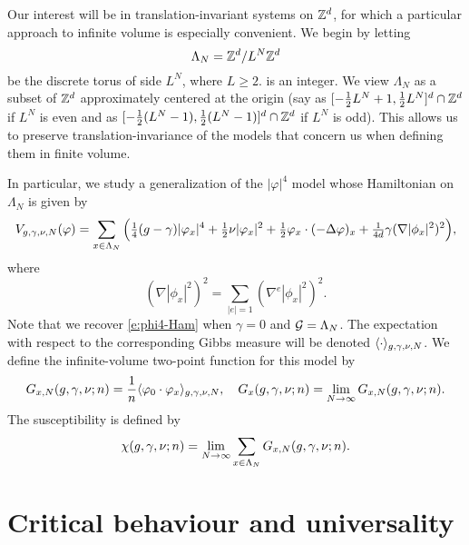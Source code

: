Our interest will be in translation-invariant systems on ${ {{\mathbb Z}}^d }$, for which a particular
approach to infinite volume is especially convenient. We begin by letting
\begin{equation}
\Lambda_N = { {{\mathbb Z}}^d }/L^N{ {{\mathbb Z}}^d }
\end{equation}
be the discrete torus of side $L^N$, where $L \ge 2$. is an integer. We view $\Lambda_N$
as a subset of ${ {{\mathbb Z}}^d }$ approximately centered at the origin (say as
$[-\frac12 L^N+1,\frac12 L^N]^d \cap {\mathbb Z}^d$ if $L^N$ is even
and as $[-\frac12 (L^N-1), \frac12 (L^N-1)]^d \cap {\mathbb Z}^d$ if $L^N$ is odd). This allows us to preserve
translation-invariance of the models that concern us when defining them in finite volume.

In particular, we study a generalization of the $|\varphi|^4$ model whose Hamiltonian
on $\Lambda_N$ is given by
\begin{equation}
\label{e:Vdef1}
V_{g,\gamma,\nu,N}(\varphi)
	=
\sum_{x\in\Lambda_N}
\Big(
	\tfrac{1}{4} (g - \gamma) |\varphi_x|^4
		+
	\tfrac{1}{2} \nu |\varphi_x|^2
		+
	\tfrac{1}{2} \varphi_x \cdot (-\Delta \varphi)_x
		+
	\tfrac{1}{4 d} \gamma (\nabla |\phi_x|^2)^2
\Big),
\end{equation}
where
\begin{equation}
(\nabla |\phi_x|^2)^2
	=
\sum_{|e|=1} (\nabla^e |\phi_x|^2)^2.
\end{equation}
Note that we recover \eqref{e:phi4-Ham} when $\gamma = 0$ and $\mathcal{G} = \Lambda_N$.
The expectation with respect to the corresponding Gibbs measure will
be denoted $\langle\cdot\rangle_{g,\gamma,\nu,N}$.
We define the infinite-volume two-point function for this model by
\begin{equation}
\label{e:two-point-function-phi4}
G_{x, N}(g,\gamma,\nu; n)
	=
\frac{1}{n} \langle \varphi_0 \cdot \varphi_x \rangle_{g,\gamma,\nu,N},
	\quad
G_x(g,\gamma,\nu; n)
	=
\lim_{N \rightarrow \infty} G_{x, N}(g,\gamma,\nu; n).
\end{equation}
The susceptibility is defined by
\begin{equation}
\label{e:susceptibility-def}
\chi(g, \gamma, \nu; n)
	=
\lim_{N\rightarrow\infty} \sum_{x\in\Lambda_N} G_{x,N}(g, \gamma, \nu; n).
\end{equation}


\section{Critical behaviour and universality}

